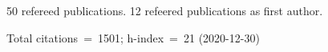 50 refereed publications. 12 refeered publications as first author.

Total citations~=~1501; h-index~=~21 (2020-12-30)